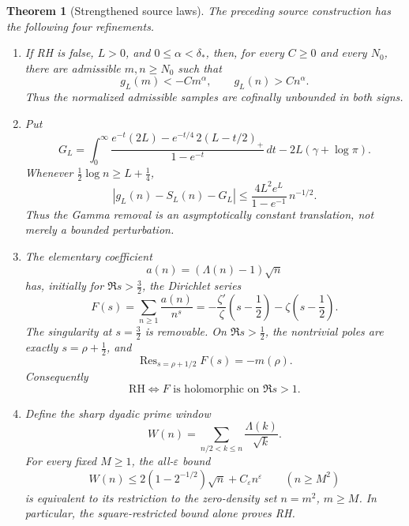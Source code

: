 \documentclass[11pt]{article}
\newtheorem{theorem}{Theorem}[section]
\newcommand{\Res}{\operatorname{Res}}
\begin{document}
\begin{theorem}[Strengthened source laws]
\label{thm:source-strengthenings}
The preceding source construction has the following four refinements.
\begin{enumerate}[label=\textup{(\roman*)}]
\item If RH is false, $L>0$, and $0\le\alpha<\delta_*$, then, for every $C\ge0$ and every
$N_0$, there are admissible $m,n\ge N_0$ such that
\[
 g_L(m)<-C m^\alpha,\qquad g_L(n)>C n^\alpha.
 \tag{6.35}
\]
Thus the normalized admissible samples are cofinally unbounded in both signs.

\item Put
\[
 G_L=\int_0^\infty
 \frac{e^{-t}(2L)-e^{-t/4}\,2(L-t/2)_+}{1-e^{-t}}\,dt
      -2L(\gamma+\log\pi).
 \tag{6.37}
\]
Whenever $\frac12\log n\ge L+\frac14$,
\[
 |g_L(n)-S_L(n)-G_L|
 \le
 \frac{4L^2e^L}{1-e^{-1}}\,n^{-1/2}.
 \tag{6.38}
\]
Thus the Gamma removal is an asymptotically constant translation, not merely a bounded
perturbation.

\item The elementary coefficient
\[
 a(n)=(\Lambda(n)-1)\sqrt n
 \tag{6.39}
\]
has, initially for $\Re s>\frac32$, the Dirichlet series
\[
 F(s)=\sum_{n\ge1}\frac{a(n)}{n^s}
 =-\frac{\zeta'}{\zeta}\!\left(s-\frac12\right)
   -\zeta\!\left(s-\frac12\right).
 \tag{6.40}
\]
The singularity at $s=\frac32$ is removable.  On $\Re s>\frac12$, the nontrivial poles are
exactly $s=\rho+\frac12$, and
\[
 \Res_{s=\rho+1/2}F(s)=-m(\rho).
 \tag{6.41}
\]
Consequently
\[
 \mathrm{RH}\Longleftrightarrow F\text{ is holomorphic on }\Re s>1.
 \tag{6.42}
\]

\item Define the sharp dyadic prime window
\[
 W(n)=\sum_{n/2<k\le n}\frac{\Lambda(k)}{\sqrt k}.
 \tag{6.43}
\]
For every fixed $M\ge1$, the all-$\varepsilon$ bound
\[
 W(n)\le2(1-2^{-1/2})\sqrt n+C_\varepsilon n^\varepsilon
 \qquad(n\ge M^2)
 \tag{6.44}
\]
is equivalent to its restriction to the zero-density set $n=m^2$, $m\ge M$.  In particular,
the square-restricted bound alone proves RH.
\end{enumerate}
\end{theorem}
\end{document}

